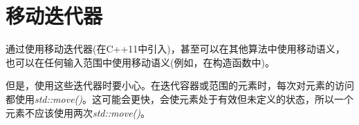 \section{移动迭代器}
通过使用移动迭代器(在C++11中引入)，甚至可以在其他算法中使用移动语义，也可以在任何输入范围中使用移动语义(例如，在构造函数中)。

但是，使用这些迭代器时要小心。在迭代容器或范围的元素时，每次对元素的访问都使用\textit{std::move()}。这可能会更快，会使元素处于有效但未定义的状态，所以一个元素不应该使用两次\textit{std::move()}。
































































